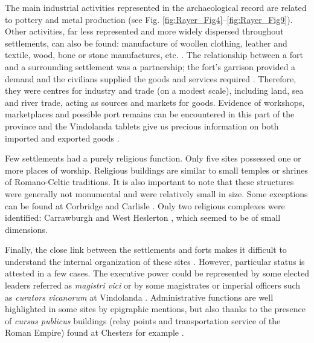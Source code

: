 The main industrial activities represented in the archaeological record are related to pottery and metal production (see Fig. \ref{fig:Rayer_Fig4}--\ref{fig:Rayer_Fig9}). Other activities, far less represented and more widely dispersed throughout settlements, can also be found: manufacture of woollen clothing, leather and textile, wood, bone or stone manufactures, etc. \parencites[148]{Clack_1982}[35]{Sommer_1984}[for the example of a workshop of Roman sculptures at Carlisle, see][90]{McCarthy_2002}. The relationship between a fort and a surrounding settlement was a partnership; the fort’s garrison provided a demand and the civilians supplied the goods and services required \parencite[85]{Bidwell_2007}. Therefore, they were centres for industry and trade (on a modest scale), including land, sea and river trade, acting as sources and markets for goods. Evidence of workshops, marketplaces and possible port remains can be encountered in this part of the province and the Vindolanda tablets give us precious information on both imported and exported goods \parencites{Bowman_2008}[69]{Osborn_2006}.

Few settlements had a purely religious function. Only five sites possessed one or more places of worship. Religious buildings are similar to small temples or shrines of Romano-Celtic traditions. It is also important to note that these structures were generally not monumental and were relatively small in size. Some exceptions can be found at Corbridge \parencite{Hodgson_2010} and Carlisle \parencite[83]{McCarthy_2002}. Only two religious complexes were identified: Carrawburgh \parencite{Breeze_1972} and West Heslerton \parencite{Halkon_2013}, which seemed to be of small dimensions.

Finally, the close link between the settlements and forts makes it difficult to understand the internal organization of these sites \parencite[22]{Sommer_1984}. However, particular status is attested in a few cases. The executive power could be represented by some elected leaders referred as \textit{magistri vici} \parencite[found at Old Carlisle;][899]{RIB_1965} or by some magistrates or imperial officers such as \textit{curators vicanorum} at Vindolanda \parencite[1700]{RIB_1965}. Administrative functions are well highlighted in some sites by epigraphic mentions, but also thanks to the presence of \textit{cursus publicus} buildings (relay points and transportation service of the Roman Empire) found at Chesters for example \parencite{Hodgson_2009}.



